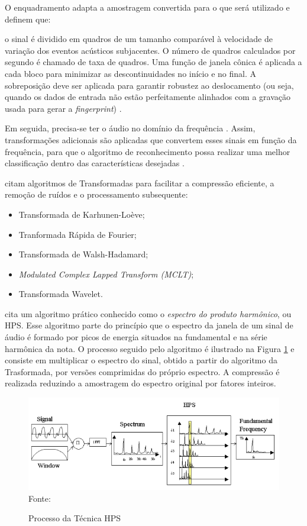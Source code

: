 O enquadramento adapta a amostragem convertida para o que será utilizado e  definem que:

\begin{citacao}
[...]o sinal é dividido em quadros de um tamanho comparável à velocidade de variação dos eventos acústicos subjacentes. O número de quadros calculados por segundo é chamado de taxa de quadros. Uma função de janela cônica é aplicada a cada bloco para minimizar as descontinuidades no início e no final. A sobreposição deve ser aplicada para garantir robustez ao deslocamento (ou seja, quando os dados de entrada não estão perfeitamente alinhados com a gravação usada para gerar a \textit{fingerprint}) \cite{cano2005}.
\end{citacao}

Em seguida, precisa-se ter o áudio no domínio da frequência \cite{bunnell1996a}. Assim, transformações adicionais são aplicadas que convertem esses sinais em função da frequência, para que o algoritmo de reconhecimento possa realizar uma melhor classificação dentro das características desejadas \cite{santos2011}.

 citam algoritmos de Transformadas para facilitar a compressão eficiente, a remoção de ruídos e o processamento subsequente:

\begin{itemize}
    \item Transformada de Karhunen-Loève;
    \item Tranformada Rápida de Fourier;
    \item Transformada de Walsh-Hadamard;
    \item \textit{Modulated Complex Lapped Transform (MCLT)};
    \item Transformada Wavelet.
\end{itemize}

 cita um algoritmo prático conhecido como o \textit{espectro do produto harmônico}, ou HPS. Esse algoritmo parte do princípio que o espectro da janela de um sinal de áudio é formado por picos de energia situados na fundamental e na série harmônica da nota. O processo seguido pelo algoritmo é ilustrado na Figura \ref{fig:hps} e consiste em multiplicar o espectro do sinal, obtido a partir do algoritmo da Trasformada, por versões comprimidas do próprio espectro. A compressão é realizada reduzindo a amostragem do espectro original por fatores inteiros.

\begin{figure}[!htb]
   \centering
   \caption{Processo da Técnica HPS}\label{fig:hps} 
   \includegraphics[scale=0.62]{figuras/hps.png}
   \\Fonte: \cite{santos2011}
\end{figure}

